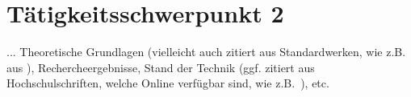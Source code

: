 \chapter{Tätigkeitsschwerpunkt 2}
\label{cha:Grundlagen}

... Theoretische Grundlagen (vielleicht auch zitiert aus Standardwerken, wie z.B. aus \autocite{Tipler.2019}), Rechercheergebnisse, Stand der Technik  (ggf. zitiert aus Hochschulschriften, welche Online verfügbar sind, wie z.B.~\autocite{Ziegler.2017}), etc.
